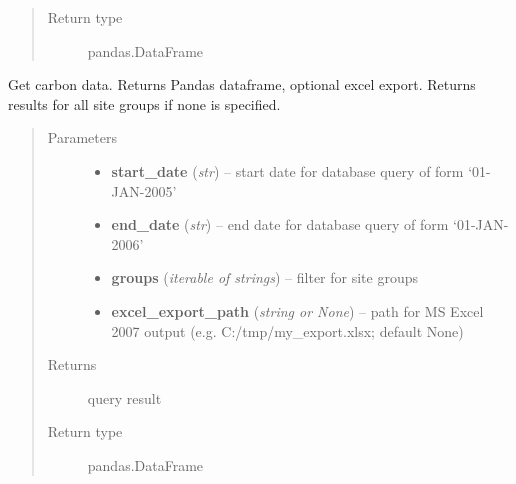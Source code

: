 \documentclass[letterpaper,10pt,english]{sphinxmanual}
\begin{document}
\begin{fulllineitems}
\begin{fulllineitems}
\begin{quote}
\begin{description}
\item[{Return type}] \leavevmode
pandas.DataFrame

\end{description}\end{quote}

\end{fulllineitems}


\begin{fulllineitems}
\label{modules:webb_utils.retrieve_data.RetrieveData.get_carbon_data}
Get carbon data. Returns Pandas dataframe, optional excel export.
Returns results for all site groups if none is specified.
\begin{quote}\begin{description}
\item[{Parameters}] \leavevmode\begin{itemize}
\item {} 
\textbf{start\_date} (\emph{str}) -- start date for database query of form `01-JAN-2005'

\item {} 
\textbf{end\_date} (\emph{str}) -- end date for database query of form `01-JAN-2006'

\item {} 
\textbf{groups} (\emph{iterable of strings}) -- filter for site groups

\item {} 
\textbf{excel\_export\_path} (\emph{string or None}) -- path for MS Excel 2007 output (e.g. C:/tmp/my\_export.xlsx; default None)

\end{itemize}

\item[{Returns}] \leavevmode
query result

\item[{Return type}] \leavevmode
pandas.DataFrame

\end{description}\end{quote}

\end{fulllineitems}



\end{fulllineitems}
\end{document}
